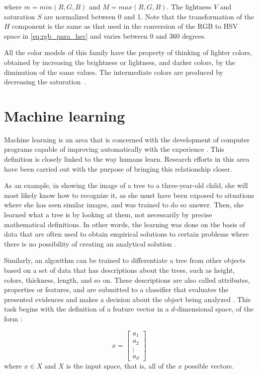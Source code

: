 \noindent where $m = min(R, G ,B)$ and $M = max(R, G ,B)$. The lightness $V$ and saturation $S$ are normalized between 0 and 1. Note that the transformation of the $H$ component is the same as that used in the conversion of the RGB to HSV space in \ref{eq:rgb_para_hsv} and varies between 0 and 360 degrees.

All the color models of this family have the property of thinking of lighter colors, obtained by increasing the brightness or lightness, and darker colors, by the diminution of the same values. The intermediate colors are produced by decreasing the saturation~\citep{pedrini:08}.


\section{Machine learning}
\label{sec:classificadores}
Machine learning is an area that is concerned with the development of computer programs capable of improving automatically with the experience \citep{mitchell:97}. This definition is closely linked to the way humans learn. Research efforts in this area have been carried out with the purpose of bringing this relationship closer.

As an example, in showing the image of a tree to a three-year-old child, she will most likely know how to recognize it, as she must have been exposed to situations where she has seen similar images, and was trained to do so answer. Then, she learned what a tree is by looking at them, not necessarily by precise mathematical definitions. In other words, the learning was done on the basis of data that are often used to obtain empirical solutions to certain problems where there is no possibility of creating an analytical solution \citep{mostafa:12}.

Similarly, an algorithm can be trained to differentiate a tree from other objects based on a set of data that has descriptions about the trees, such as height, colors, thickness, length, and so on. These descriptions are also called attributes, properties or features, and are submitted to a classifier that evaluates the presented evidences and makes a decision about the object being analyzed \citep{duda:12}. This task begins with the definition of a feature vector in a $d$-dimensional space, of the form \citep{duda:12}:

\begin{equation}
\label{eq:vetor_caracteristicas}
  x = 
  \begin{bmatrix}
    a_1 \\ a_2 \\ \vdots \\ a_d
  \end{bmatrix}
\end{equation}
\noindent where $x \in X$ and $X$ is the input space, that is, all of the $x$ possible vectors.

